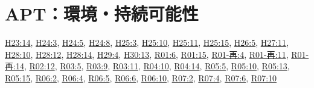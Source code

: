 \section{APT：環境・持続可能性}
\hyperref[q:h23-reg-apt-14]{H23:14}, \hyperref[q:h24-reg-apt-03]{H24:3}, \hyperref[q:h24-reg-apt-05]{H24:5}, \hyperref[q:h24-reg-apt-08]{H24:8}, \hyperref[q:h25-reg-apt-03]{H25:3}, \hyperref[q:h25-reg-apt-10]{H25:10}, \hyperref[q:h25-reg-apt-11]{H25:11}, \hyperref[q:h25-reg-apt-15]{H25:15}, \hyperref[q:h26-reg-apt-05]{H26:5}, \hyperref[q:h27-reg-apt-11]{H27:11}, \hyperref[q:h28-reg-apt-10]{H28:10}, \hyperref[q:h28-reg-apt-12]{H28:12}, \hyperref[q:h28-reg-apt-14]{H28:14}, \hyperref[q:h29-reg-apt-04]{H29:4}, \hyperref[q:h30-reg-apt-13]{H30:13}, \hyperref[q:r01-reg-apt-06]{R01:6}, \hyperref[q:r01-reg-apt-15]{R01:15}, \hyperref[q:r01-ret-apt-04]{R01-再:4}, \hyperref[q:r01-ret-apt-11]{R01-再:11}, \hyperref[q:r01-ret-apt-14]{R01-再:14}, \hyperref[q:r02-reg-apt-12]{R02:12}, \hyperref[q:r03-reg-apt-05]{R03:5}, \hyperref[q:r03-reg-apt-09]{R03:9}, \hyperref[q:r03-reg-apt-11]{R03:11}, \hyperref[q:r04-reg-apt-10]{R04:10}, \hyperref[q:r04-reg-apt-14]{R04:14}, \hyperref[q:r05-reg-apt-05]{R05:5}, \hyperref[q:r05-reg-apt-10]{R05:10}, \hyperref[q:r05-reg-apt-13]{R05:13}, \hyperref[q:r05-reg-apt-15]{R05:15}, \hyperref[q:r06-reg-apt-02]{R06:2}, \hyperref[q:r06-reg-apt-04]{R06:4}, \hyperref[q:r06-reg-apt-05]{R06:5}, \hyperref[q:r06-reg-apt-06]{R06:6}, \hyperref[q:r06-reg-apt-10]{R06:10}, \hyperref[q:r07-reg-apt-02]{R07:2}, \hyperref[q:r07-reg-apt-04]{R07:4}, \hyperref[q:r07-reg-apt-06]{R07:6}, \hyperref[q:r07-reg-apt-10]{R07:10}
